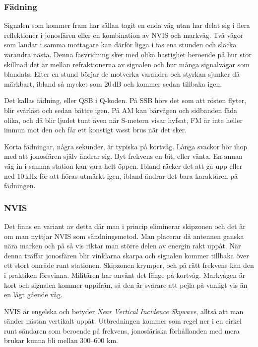 \subsubsection{Fädning}

Signalen som kommer fram har sällan tagit en enda väg utan har delat
sig i flera reflektioner i jonosfären eller en kombination av NVIS och
markvåg. Två vågor som landar i samma mottagare kan därför ligga i fas
ena stunden och släcka varandra nästa. Denna fasvridning sker med
olika hastighet beroende på hur stor skillnad det är mellan
refraktionerna av signalen och hur många signalvägar som
blandats. Efter en stund börjar de motverka varandra och styrkan
sjunker då märkbart, ibland så mycket som 20\,dB och kommer
sedan tillbaka igen.

Det kallas fädning, eller QSB i Q-koden. På SSB hörs det som att
rösten flyter, blir svårläst och sedan bättre igen. På AM kan bärvågen
och sidbanden fäda olika, och då blir ljudet tunt även när S-metern
visar hyfsat, FM är inte heller immun mot den och får ett konstigt
vasst brus när det sker.

Korta fädningar, några sekunder, är typiska på kortvåg. Långa svackor
hör ihop med att jonosfären själv ändrar sig. Byt frekvens en bit,
eller vänta. En annan väg in i samma station kan vara helt
öppen. Ibland räcker det att gå upp eller ned 10\,kHz för att höras
utmärkt igen, ibland ändrar det bara karaktären på fädningen.

\subsubsection{NVIS}
\label{sec:nvis}

Det finns en variant av detta där man i princip eliminerar skipzonen
och det är om man nyttjar NVIS som sändningsmetod. Man placerar då
antennen ganska nära marken och på så vis riktar man större delen av
energin rakt uppåt. När denna träffar jonosfären blir vinklarna skarpa
och signalen kommer tillbaka över ett stort område runt
stationen. Skipzonen krymper, och på rätt frekvens kan den i praktiken
försvinna. Militären har använt det länge på kortvåg. Markvågen är
kort och signalen kommer uppifrån, så den är svårare att pejla på
vanligt vis än en lågt gående våg.

NVIS är engelska och betyder \textit{Near Vertical Incidence Skywave},
alltså att man sänder nästan vertikalt uppåt. Utbredningen kommer som
regel ner i en cirkel runt sändaren som beroende på frekvens,
jonosfäriska förhållanden med mera brukar kunna bli mellan 300--600
km.

